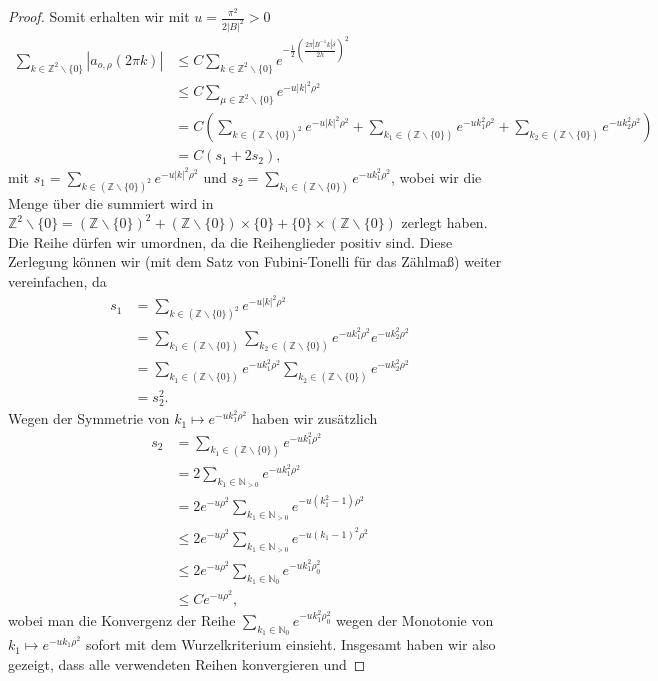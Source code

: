 \documentclass[12pt,a4paper]{scrartcl}
\numberwithin{equation}{section}
\newcommand{\Z}{\mathbb{Z}} %
\newcommand{\N}{\mathbb{N}} %
\begin{document}
\begin{proof}
Somit erhalten wir mit $u= \frac{\pi^2}{2|B|^2}>0 $ 
\begin{align*}
\sum_{k \in \Z^2 \backslash \{0\} }|a_{o,\rho}(2 \pi k)| 
&\leq C
\sum_{k \in \Z^2 \backslash \{0\} }e^{-\frac{1}{2}\left(\frac{2 \pi|B^{-1}k|\delta}{2h}\right)^2} \\
& \leq C \sum_{\mu \in \Z^2 \backslash \{0\} }e^{-u |k|^2\rho^2} \\
& = C \left(\sum_{k \in (\Z \backslash \{0\})^2 }e^{-u |k|^2\rho^2} + \sum_{k_1 \in (\Z \backslash \{0\}) }e^{-u k_1^2\rho^2} + \sum_{k_2 \in (\Z \backslash \{0\}) }e^{-u k_2^2\rho^2} \right) \\
&= C (s_1 + 2 s_2),
\end{align*}
mit $s_1=\sum_{k \in (\Z \backslash \{0\})^2 }e^{-u |k|^2\rho^2}$ und $s_2=\sum_{k_1 \in (\Z \backslash \{0\}) }e^{-u k_1^2\rho^2}$, wobei wir die Menge über die summiert wird in $\Z^2 \backslash \{0\} = (\Z \backslash \{0\})^2 + (\Z \backslash \{0\})\times \{0\} + \{0\} \times (\Z \backslash \{0\})$ zerlegt haben. Die Reihe dürfen wir umordnen, da die Reihenglieder positiv sind. Diese Zerlegung können wir (mit dem Satz von Fubini-Tonelli für das Zählmaß) weiter vereinfachen, da 
\begin{align*}
s_1 
&= \sum_{k \in (\Z \backslash \{0\})^2 }e^{-u |k|^2\rho^2} \\
&= \sum_{k_1 \in (\Z \backslash \{0\})} \sum_{k_2 \in (\Z \backslash \{0\})} e^{-u k_1^2\rho^2}e^{-u k_2^2\rho^2} \\
&=\sum_{k_1 \in (\Z \backslash \{0\})} e^{-u k_1^2\rho^2} \sum_{k_2 \in (\Z \backslash \{0\})}e^{-u k_2^2\rho^2} \\
&= s_2^2.
\end{align*} 
Wegen der Symmetrie von $k_1 \mapsto e^{-u k_1^2\rho^2}$ haben wir zusätzlich
\begin{align*}
s_2 
&= \sum_{k_1 \in (\Z \backslash \{0\})} e^{-u k_1^2\rho^2} \\
&= 2 \sum_{k_1 \in \N_{>0}} e^{-u k_1^2\rho^2} \\
&= 2 e^{-u \rho^2} \sum_{k_1 \in \N_{>0}} e^{-u (k_1^2-1)\rho^2} \\
& \leq 2 e^{-u \rho^2} \sum_{k_1 \in \N_{>0}} e^{-u (k_1-1)^2\rho^2} \\
&\leq 2 e^{-u \rho^2} \sum_{k_1 \in \N_0} e^{-u k_1^2\rho_0^2} \\
& \leq C  e^{-u \rho^2},
\end{align*}
wobei man die Konvergenz der Reihe $\sum_{k_1 \in \N_0} e^{-u k_1^2\rho_0^2}$ wegen der Monotonie von $k_1 \mapsto e^{-u k_1\rho^2}$ sofort mit dem Wurzelkriterium einsieht. Insgesamt haben wir also gezeigt, dass alle verwendeten Reihen konvergieren und

\end{proof}
\end{document}
